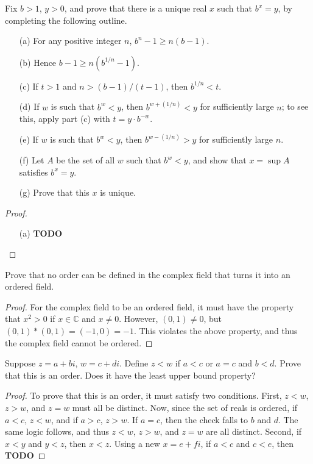 \documentclass[a4paper]{article}
\begin{document}
\begin{ex}[7]
 Fix $b>1$, $y>0$, and prove that there is a unique real $x$ such that $b^x=y$, by completing the following outline.
    \begin{enumerate}
        \item[(a)] For any positive integer $n$, $b^n-1\ge n(b-1)$.
        \item[(b)] Hence $b-1\ge n(b^{1/n}-1)$.
        \item[(c)] If $t>1$ and $n>(b-1)/(t-1)$, then $b^{1/n}<t$.
        \item[(d)] If $w$ is such that $b^w<y$, then $b^{w+(1/n)}<y$ for sufficiently large $n$; to see this, apply part (c) with $t=y\cdot b^{-w}$.
        \item[(e)] If $w$ is such that $b^w<y$, then $b^{w-(1/n)}>y$ for sufficiently large $n$.
        \item[(f)] Let $A$ be the set of all $w$ such that $b^w<y$, and show that $x=\sup A$ satisfies $b^x=y$.
        \item[(g)] Prove that this $x$ is unique.
    \end{enumerate}
\begin{proof}
\begin{enumerate}
    \item[(a)] \textbf{TODO}
\end{enumerate}
\end{proof}
\end{ex}

\begin{ex}[8]
Prove that no order can be defined in the complex field that turns it into an ordered field.
\begin{proof}
For the complex field to be an ordered field, it must have the property that $x^2 > 0$ if $x \in \mathbb{C}$ and $x \neq 0$. However, $(0,1) \neq 0$, but $(0,1) * (0,1) = (-1, 0) = -1$. This violates the above property, and thus the complex field cannot be ordered.
\end{proof}
\end{ex}

\begin{ex}[9]
Suppose $z = a + bi$, $w = c + di$. Define $z < w$ if $a < c$ or $a = c$ and $b < d$. Prove that this is an order. Does it have the least upper bound property?
\begin{proof}
To prove that this is an order, it must satisfy two conditions. First, $z < w$, $z > w$, and $z = w$ must all be distinct. Now, since the set of reals is ordered, if $a < c$, $z < w$, and if $a > c$, $z > w$. If $a = c$, then the check falls to $b$ and $d$. The same logic follows, and thus $z < w$, $z > w$, and $z = w$ are all distinct. Second, if $x < y$ and $y < z$, then $x < z$. Using a new $x = e + fi$, if $a < c$ and $c < e$, then \textbf{TODO}
\end{proof}
\end{ex}
\end{document}

